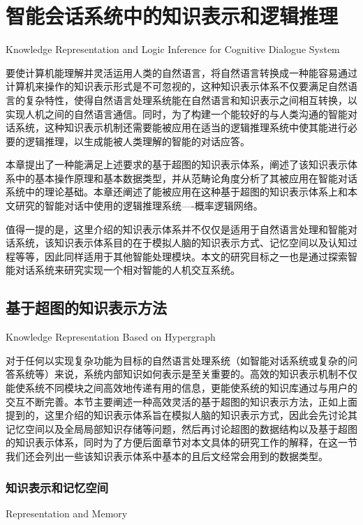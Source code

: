 \chapter{智能会话系统中的知识表示和逻辑推理}{Knowledge Representation and Logic Inference for Cognitive Dialogue System}
\label{chap:representation}


要使计算机能理解并灵活运用人类的自然语言，将自然语言转换成一种能容易通过计算机来操作的知识表示形式是不可忽视的，这种知识表示体系不仅要满足自然语言的复杂特性，使得自然语言处理系统能在自然语言和知识表示之间相互转换，以实现人机之间的自然语言通信。同时，为了构建一个能较好的与人类沟通的智能对话系统，这种知识表示机制还需要能被应用在适当的逻辑推理系统中使其能进行必要的逻辑推理，以生成能被人类理解的智能的对话应答。

本章提出了一种能满足上述要求的基于超图的知识表示体系，阐述了该知识表示体系中的基本操作原理和基本数据类型，并从范畴论角度分析了其被应用在智能对话系统中的理论基础。本章还阐述了能被应用在这种基于超图的知识表示体系上和本文研究的智能对话中使用的逻辑推理系统----概率逻辑网络。

值得一提的是，这里介绍的知识表示体系并不仅仅是适用于自然语言处理和智能对话系统，该知识表示体系目的在于模拟人脑的知识表示方式、记忆空间以及认知过程等等，因此同样适用于其他智能处理模块。本文的研究目标之一也是通过探索智能对话系统来研究实现一个相对智能的人机交互系统。

\section{基于超图的知识表示方法}{Knowledge Representation Based on Hypergraph}

对于任何以实现复杂功能为目标的自然语言处理系统（如智能对话系统或复杂的问答系统等）来说，系统内部知识如何表示是至关重要的。高效的知识表示机制不仅能使系统不同模块之间高效地传递有用的信息，更能使系统的知识库通过与用户的交互不断完善。本节主要阐述一种高效灵活的基于超图的知识表示方法，正如上面提到的，这里介绍的知识表示体系旨在模拟人脑的知识表示方式，因此会先讨论其记忆空间以及全局局部知识存储等问题，然后再讨论超图的数据结构以及基于超图的知识表示体系，同时为了方便后面章节对本文具体的研究工作的解释，在这一节我们还会列出一些该知识表示体系中基本的且后文经常会用到的数据类型。

\subsection{知识表示和记忆空间}{Representation and Memory}

